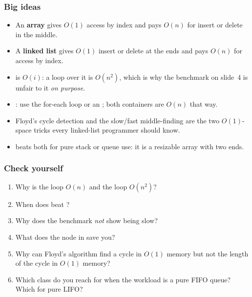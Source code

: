 \documentclass[aspectratio=169,10pt,compress]{beamer}
\begin{document}
\begin{frame}[t,fragile] \frametitle{Big ideas}
  \begin{itemize}
    \item An \textbf{array} gives $O(1)$ access by index and pays
          $O(n)$ for insert or delete in the middle.
    \item A \textbf{linked list} gives $O(1)$ insert or delete at
          the ends and pays $O(n)$ for access by index.
    \item {} is $O(i)$: a loop over it is
          $O(n^2)$, which is why the benchmark on slide~4 is unfair
          to it \emph{on purpose}.
    \item {}: use the for-each loop or an
          ; both containers are $O(n)$ that way.
    \item Floyd's cycle detection and the slow/fast middle-finding are
          the two $O(1)$-space tricks every linked-list programmer
          should know.
    \item {} beats both for pure stack or queue use:
          it is a resizable array with two ends.
  \end{itemize}
\end{frame}




\begin{frame}[t,fragile] \frametitle{Check yourself}
  \begin{enumerate}\small
    \item Why is the  loop $O(n)$ and the
           loop $O(n^2)$?
    \item When does  beat
          ?
    \item Why does the benchmark \emph{not} show
           being slow?
    \item What does the  node in 
          save you?
    \item Why can Floyd's algorithm find a cycle in $O(1)$ memory
          but not the length of the cycle in $O(1)$ memory?
    \item Which class do you reach for when the workload is a pure
          FIFO queue? Which for pure LIFO?
  \end{enumerate}
\end{frame}
\end{document}
